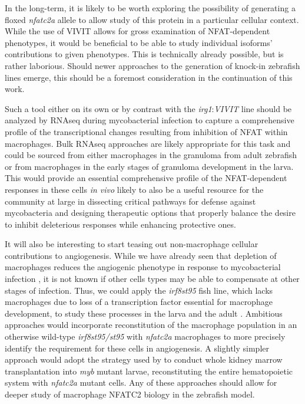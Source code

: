 In the long-term, it is likely to be worth exploring the possibility of generating a floxed \textit{nfatc2a} allele to allow study of this protein in a particular cellular context. While the use of VIVIT allows for gross examination of NFAT-dependent phenotypes, it would be beneficial to be able to study individual isoforms' contributions to given phenotypes. This is technically already possible, but is rather laborious. Should newer approaches to the generation of knock-in zebrafish lines emerge, this should be a foremost consideration in the continuation of this work.

Such a tool either on its own or by contrast with the \textit{irg1}:\textit{VIVIT} line should be analyzed by RNAseq during mycobacterial infection to capture a comprehensive profile of the transcriptional changes resulting from inhibition of NFAT within macrophages. Bulk RNAseq approaches are likely appropriate for this task and could be sourced from either macrophages in the granuloma from adult zebrafish or from macrophages in the early stages of granuloma development in the larva. This would provide an essential comprehensive profile of the NFAT-dependent responses in these cells \textit{in vivo} likely to also be a useful resource for the community at large in dissecting critical pathways for defense against mycobacteria and designing therapeutic options that properly balance the desire to inhibit deleterious responses while enhancing protective ones.

It will also be interesting to start teasing out non-macrophage cellular contributions to angiogenesis. While we have already seen that depletion of macrophages reduces the angiogenic phenotype in response to mycobacterial infection \citep{Oehlers2015}, it is not known if other cells types may be able to compensate at other stages of infection. Thus, we could apply the \textit{irf8\textit{st95}} fish line, which lacks macrophages due to loss of a transcription factor essential for macrophage development, to study these processes in the larva and the adult \citep{Shiau2015, Xu2012, Tamura2005}. Ambitious approaches would incorporate reconstitution of the macrophage population in an otherwise wild-type \textit{irf8\textit{st95/st95}} with \textit{nfatc2a} macrophages to more precisely identify the requirement for these cells in angiogenesis. A slightly simpler approach would adopt the strategy used by \citet{Cronan2021} to conduct whole kidney marrow transplantation into \textit{myb} mutant larvae, reconstituting the entire hematopoietic system with \textit{nfatc2a} mutant cells. Any of these approaches should allow for deeper study of macrophage NFATC2 biology in the zebrafish model.


